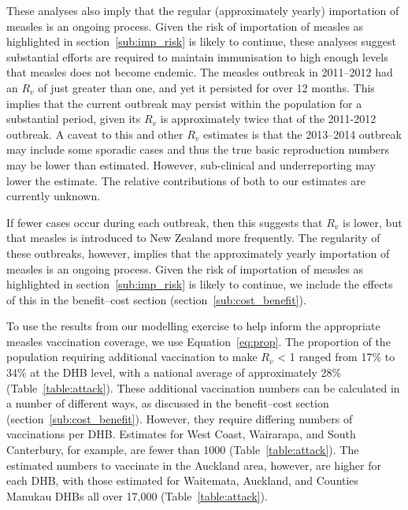 \documentclass{article}
\begin{document}
These analyses also imply that the regular (approximately yearly) importation of measles is an ongoing process. Given the risk of importation of measles as highlighted in section~\autoref{sub:imp_risk} is likely to continue, these analyses suggest substantial efforts are required to maintain immunisation to high enough levels that measles does not become endemic. The measles outbreak in 2011--2012 had an $R_v$ of just greater than one, and yet it persisted for over 12 months. This implies that the current outbreak may persist within the population for a substantial period, given its $R_v$ is approximately twice that of the 2011-2012 outbreak. A caveat to this and other $R_v$ estimates is that the 2013--2014 outbreak may include some sporadic cases and thus the true basic reproduction numbers may be lower than estimated. However, sub-clinical and underreporting may lower the estimate. The relative contributions of both to our estimates are currently unknown. 

If fewer cases occur during each outbreak, then this suggests that $R_v$ is lower, but that measles is introduced to New Zealand more frequently. The regularity of these outbreaks, however, implies that the approximately yearly importation of measles is an ongoing process. Given the risk of importation of measles as highlighted in section~\autoref{sub:imp_risk} is likely to continue, we include the effects of this in the benefit--cost section (section~\autoref{sub:cost_benefit}).

To use the results from our modelling exercise to help inform the appropriate measles vaccination coverage, we use Equation~\autoref{eq:prop}. The proportion of the population requiring additional vaccination to make $R_v$ < 1 ranged from 17\% to 34\% at the DHB level, with a national average of approximately 28\% (Table~\autoref{table:attack}). These additional vaccination numbers can be calculated in a number of different ways, as discussed in the benefit--cost section (section~\autoref{sub:cost_benefit}). However, they require differing numbers of vaccinations per DHB. Estimates for West Coast, Wairarapa, and South Canterbury, for example, are fewer than 1000 (Table~\autoref{table:attack}). The estimated numbers to vaccinate in the Auckland area, however, are higher for each DHB, with those estimated for Waitemata, Auckland, and Counties Manukau DHBs all over 17,000  (Table~\autoref{table:attack}).
\end{document}
